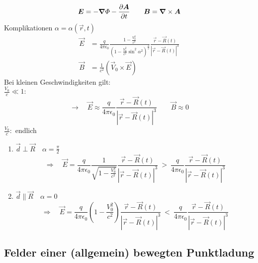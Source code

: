 \begin{equation*}
\bm{E} = - \bm{\nabla} \varPhi - \frac{\partial \bm{A}}{\partial t} \qquad \bm{B} = \bm{\nabla} \times \bm{A}
\end{equation*}
Komplikationen $ \alpha = \alpha(\vec{r},t) $
%
%
%
%
%
%
\begin{align*}
\vec{E} &= \frac{q}{4 \pi \epsilon_0} \frac{1 - \frac{V_0^2}{c^2}}{\left(1 - \frac{V_0^2}{c^2} \sin^2 \alpha^2\right)^{\frac{3}{2}}} \frac{\vec{r} - \vec{R}(t)}{|\vec{r} - \vec{R}(t)|^3}\\
\vec{B} &= \frac{1}{c^2} \left(\vec{V}_0 \times \vec{E}\right)
\end{align*}
Bei kleinen Geschwindigkeiten gilt:\\
$ \frac{V_0}{c} \ll 1 : $
\begin{equation*}
\rightarrow \quad \vec{E} \approx \frac{q}{4 \pi \epsilon_0} \frac{\vec{r} - \vec{R}(t)}{|\vec{r} - \vec{R}(t)|^3} \qquad \vec{B} \approx 0
\end{equation*}
$ \frac{V_0}{c} : $ endlich
%
%
%
%
%
%
\begin{enumerate}[1)]
	\item $ \vec{d} \perp \vec{R} \quad \alpha = \frac{\pi}{2} $
	\begin{equation*}
	\Rightarrow \quad \vec{E} = \frac{q}{4 \pi \epsilon_0} \frac{1}{\sqrt{1 - \frac{V_0^2}{c^2}}} \frac{\vec{r} - \vec{R}(t)}{|\vec{r} - \vec{R}(t)|^3} \ > \ \frac{q}{4 \pi \epsilon_0} \frac{\vec{r} - \vec{R}(t)}{|\vec{r} - \vec{R}(t)|^3}
	\end{equation*}
	\item $ \vec{d} \parallel \vec{R} \quad \alpha = 0 $
	\begin{equation*}
	\Rightarrow \quad \vec{E} = \frac{q}{4 \pi \epsilon_0} \left(1 - \frac{V_0^2}{c^2}\right) \frac{\vec{r} - \vec{R}(t)}{|\vec{r} - \vec{R}(t)|^3} \ < \ \frac{q}{4 \pi \epsilon_0} \frac{\vec{r} - \vec{R}(t)}{|\vec{r} - \vec{R}(t)|^3}
	\end{equation*}
\end{enumerate}

\subsection{Felder einer (allgemein) bewegten Punktladung}

